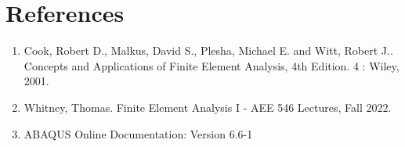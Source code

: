 \documentclass[../main.tex]{subfiles}
\begin{document}
\section{References}
\begin{enumerate}

\item Cook, Robert D., Malkus, David S., Plesha, Michael E. and Witt, Robert J.. Concepts and Applications of Finite Element Analysis, 4th Edition. 4 : Wiley, 2001.

\item Whitney, Thomas. Finite Element Analysis I - AEE 546 Lectures, Fall 2022.

\item ABAQUS Online Documentation: Version 6.6-1

\end{enumerate}
\end{document}
